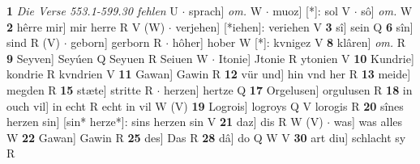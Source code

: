 \documentclass[8pt,a4paper,notitlepage]{article}
\begin{document}
\begin{table}[ht]
\begin{minipage}[t]{0.5\linewidth}
\textbf{1} \textit{Die Verse 553.1-599.30 fehlen} U   $\cdot$ sprach] \textit{om.} W  $\cdot$ muoz] [*]: sol V  $\cdot$ sô] \textit{om.} W \textbf{2} hêrre mir] mir herre R V (W)  $\cdot$ verjehen] [*iehen]: veriehen V \textbf{3} sî] sein Q \textbf{6} sîn] sind R (V)  $\cdot$ geborn] gerborn R  $\cdot$ hôher] hober W [*]: kvnigez V \textbf{8} klâren] \textit{om.} R \textbf{9} Seyven] Seyúen Q Seyuen R Seiuen W  $\cdot$ Itonie] Jtonie R ytonien V \textbf{10} Kundrie] kondrie R kvndrien V \textbf{11} Gawan] Gawin R \textbf{12} vür und] hin vnd her R \textbf{13} meide] megden R \textbf{15} stæte] stritte R  $\cdot$ herzen] hertze Q \textbf{17} Orgelusen] orgulusen R \textbf{18} in ouch vil] in echt R echt in vil W (V) \textbf{19} Logrois] logroys Q V lorogis R \textbf{20} sînes herzen sin] [sin* herze*]: sins herzen sin V \textbf{21} daz] dis R W (V)  $\cdot$ was] was alles W \textbf{22} Gawan] Gawin R \textbf{25} des] Das R \textbf{28} dâ] do Q W V \textbf{30} art diu] schlacht sy R \newline
\end{minipage}
\end{table}
\end{document}
